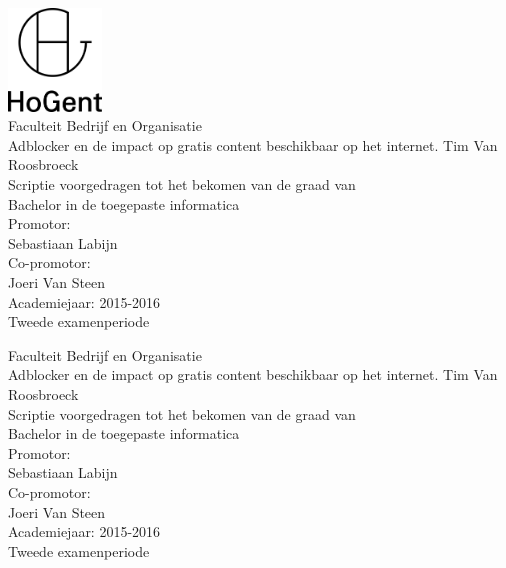 \documentclass[pdftex,a4paper,12pt,twoside]{report}
\newcommand{\emptypage}{
\newpage
\thispagestyle{empty}
\mbox{}
\newpage
}
\newcommand{\student}{Tim Van Roosbroeck}
\newcommand{\promotor}{Sebastiaan Labijn}
\newcommand{\copromotor}{Joeri Van Steen}
\newcommand{\titel}{Adblocker en de impact op gratis content beschikbaar op het internet.}
\newcommand{\faculteit}{Faculteit Bedrijf en Organisatie}
\newcommand{\rapporttype}{Scriptie voorgedragen tot het bekomen van de graad van\\Bachelor in de toegepaste informatica}
\newcommand{\academiejaar}{2015-2016}
\newcommand{\examenperiode}{Tweede examenperiode}
\begin{document}

\begin{titlepage}
  \begin{center}

    \begingroup
    \rmfamily
    \includegraphics[width=2.5cm]{img/HG-beeldmerk-woordmerk}\\[.5cm]
    \faculteit\\[3cm]
    \titel
    \vfill
    \student\\[3.5cm]
    \rapporttype\\[2cm]
    Promotor:\\
    \promotor\\
    Co-promotor:\\
    \copromotor\\[2.5cm]
    
    Academiejaar: \academiejaar\\[.5cm]
    \examenperiode
    \endgroup

  \end{center}
  \restoregeometry
\end{titlepage}



\emptypage


\begin{titlepage}
  \begin{center}

    \begingroup
    \rmfamily
    \faculteit\\[3cm]
    \titel
    \vfill
    \student\\[3.5cm]
    \rapporttype\\[2cm]
    Promotor:\\
    \promotor\\
    Co-promotor:\\
    \copromotor\\[2.5cm]
    
    Academiejaar: \academiejaar\\[.5cm]
    \examenperiode
    \endgroup

  \end{center}
  \restoregeometry
\end{titlepage}
\end{document}
